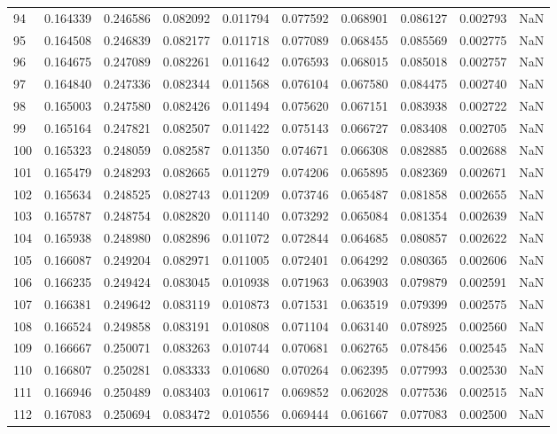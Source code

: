 \begin{tabular}{lrrrrrrrrr}
94 & 0.164339 & 0.246586 & 0.082092 & 0.011794 & 0.077592 & 0.068901 & 0.086127 & 0.002793 & NaN \\
95 & 0.164508 & 0.246839 & 0.082177 & 0.011718 & 0.077089 & 0.068455 & 0.085569 & 0.002775 & NaN \\
96 & 0.164675 & 0.247089 & 0.082261 & 0.011642 & 0.076593 & 0.068015 & 0.085018 & 0.002757 & NaN \\
97 & 0.164840 & 0.247336 & 0.082344 & 0.011568 & 0.076104 & 0.067580 & 0.084475 & 0.002740 & NaN \\
98 & 0.165003 & 0.247580 & 0.082426 & 0.011494 & 0.075620 & 0.067151 & 0.083938 & 0.002722 & NaN \\
99 & 0.165164 & 0.247821 & 0.082507 & 0.011422 & 0.075143 & 0.066727 & 0.083408 & 0.002705 & NaN \\
100 & 0.165323 & 0.248059 & 0.082587 & 0.011350 & 0.074671 & 0.066308 & 0.082885 & 0.002688 & NaN \\
101 & 0.165479 & 0.248293 & 0.082665 & 0.011279 & 0.074206 & 0.065895 & 0.082369 & 0.002671 & NaN \\
102 & 0.165634 & 0.248525 & 0.082743 & 0.011209 & 0.073746 & 0.065487 & 0.081858 & 0.002655 & NaN \\
103 & 0.165787 & 0.248754 & 0.082820 & 0.011140 & 0.073292 & 0.065084 & 0.081354 & 0.002639 & NaN \\
104 & 0.165938 & 0.248980 & 0.082896 & 0.011072 & 0.072844 & 0.064685 & 0.080857 & 0.002622 & NaN \\
105 & 0.166087 & 0.249204 & 0.082971 & 0.011005 & 0.072401 & 0.064292 & 0.080365 & 0.002606 & NaN \\
106 & 0.166235 & 0.249424 & 0.083045 & 0.010938 & 0.071963 & 0.063903 & 0.079879 & 0.002591 & NaN \\
107 & 0.166381 & 0.249642 & 0.083119 & 0.010873 & 0.071531 & 0.063519 & 0.079399 & 0.002575 & NaN \\
108 & 0.166524 & 0.249858 & 0.083191 & 0.010808 & 0.071104 & 0.063140 & 0.078925 & 0.002560 & NaN \\
109 & 0.166667 & 0.250071 & 0.083263 & 0.010744 & 0.070681 & 0.062765 & 0.078456 & 0.002545 & NaN \\
110 & 0.166807 & 0.250281 & 0.083333 & 0.010680 & 0.070264 & 0.062395 & 0.077993 & 0.002530 & NaN \\
111 & 0.166946 & 0.250489 & 0.083403 & 0.010617 & 0.069852 & 0.062028 & 0.077536 & 0.002515 & NaN \\
112 & 0.167083 & 0.250694 & 0.083472 & 0.010556 & 0.069444 & 0.061667 & 0.077083 & 0.002500 & NaN \\

\end{tabular}
